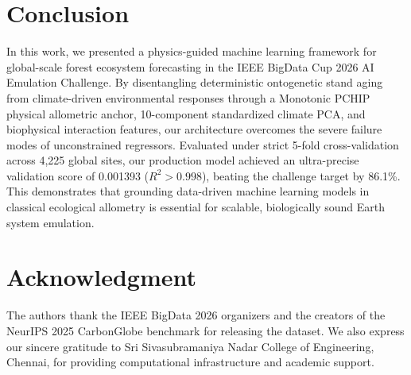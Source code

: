 \documentclass[conference]{IEEEtran}
\begin{document}
\section{Conclusion}
In this work, we presented a physics-guided machine learning framework for global-scale forest ecosystem forecasting in the IEEE BigData Cup 2026 AI Emulation Challenge. By disentangling deterministic ontogenetic stand aging from climate-driven environmental responses through a Monotonic PCHIP physical allometric anchor, 10-component standardized climate PCA, and biophysical interaction features, our architecture overcomes the severe failure modes of unconstrained regressors. Evaluated under strict 5-fold cross-validation across 4,225 global sites, our production model achieved an ultra-precise validation score of 0.001393 ($R^2 > 0.998$), beating the challenge target by 86.1\%. This demonstrates that grounding data-driven machine learning models in classical ecological allometry is essential for scalable, biologically sound Earth system emulation.

\section*{Acknowledgment}
The authors thank the IEEE BigData 2026 organizers and the creators of the NeurIPS 2025 CarbonGlobe benchmark for releasing the dataset. We also express our sincere gratitude to Sri Sivasubramaniya Nadar College of Engineering, Chennai, for providing computational infrastructure and academic support.
\end{document}
